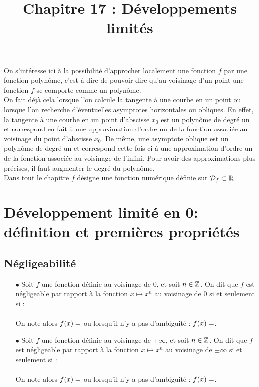 \documentclass[a4paper, 11pt]{article}
\begin{document}
\tableofcontents
 \title{Chapitre 17 : Développements limités} 

\noindent On s'int\'eresse ici \`a la possibilit\'e d'approcher localement une fonction $f$ par une fonction polyn\^ome, c'est-\`a-dire de pouvoir dire qu'au voisinage d'un point une fonction $f$ se comporte comme un polyn\^ome.\\

\noindent On fait d\'ej\`{a} cela lorsque l'on calcule la tangente \`{a} une courbe en un point ou lorsque l'on recherche d'\'eventuelles asymptotes horizontales ou obliques. En effet, la tangente \`a une courbe en un point d'abscisse $x_0$ est un polyn\^ome de degr\'e un et correspond en fait \`{a} une approximation d'ordre un de la fonction associ\'ee au voisinage du point d'abscisse $x_0$. De m\^{e}me, une asymptote oblique est un polyn\^ome de degr\'e un et correspond cette fois-ci \`{a} une approximation d'ordre un de la fonction associ\'ee au voisinage de l'infini. Pour avoir des approximations plus pr\'ecises, il faut augmenter le degr\'e du polyn\^ome.\\
 
 \noindent Dans tout le chapitre $f$ d\'esigne une fonction num\'erique d\'efinie sur $\mathcal{D}_f\subset \mathbb{R}$.


\section{D\'eveloppement limit\'e en 0: d\'efinition et premi\`{e}res propri\'et\'es}

\subsection{Négligeabilité}

\begin{defi}\hspace*{0cm}
\begin{itemize}
\item[$\bullet$] Soit $f$ une fonction d\'efinie au voisinage de 0, et soit $n \in \mathbb{Z}$. On dit que $f$ est n\'egligeable par rapport \`a la fonction $x \mapsto x^n$ au voisinage de $0$ si et seulement si : \vsec\hspace{0.5cm}\\ \phantom{} \dotfill\vsec\\ 
On note alors $f(x) = \dotfill$ ou lorsqu'il n'y a pas d'ambiguit\'e : $f(x) = \dotfill$.\vsec
\item[$\bullet$] Soit $f$ une fonction d\'efinie au voisinage de $\pm \infty$, et soit $n \in \mathbb{Z}$. On dit que $f$ est n\'egligeable par rapport \`a la fonction $x \mapsto x^n$ au voisinage de $\pm \infty$ si et seulement si :\vsec\\ \phantom{}\dotfill\vsec\\
On note alors $f(x) = \dotfill$ ou lorsqu'il n'y a pas d'ambiguit\'e : $f(x) = \dotfill$.\vsec
\end{itemize}
\end{defi}
 
\end{document}
